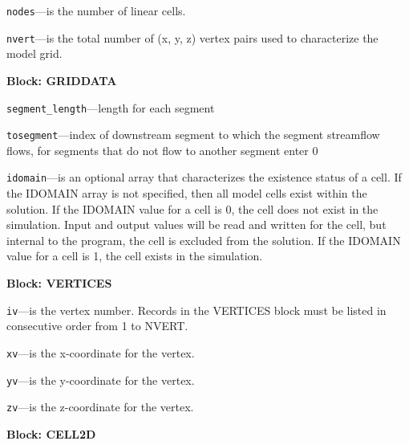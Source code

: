 \begin{description}
\item \texttt{nodes}---is the number of linear cells.

\item \texttt{nvert}---is the total number of (x, y, z) vertex pairs used to characterize the model grid.

\end{description}
\item \textbf{Block: GRIDDATA}

\begin{description}
\item \texttt{segment\_length}---length for each segment

\item \texttt{tosegment}---index of downstream segment to which the segment streamflow flows, for segments that do not flow to another segment enter 0

\item \texttt{idomain}---is an optional array that characterizes the existence status of a cell.  If the IDOMAIN array is not specified, then all model cells exist within the solution.  If the IDOMAIN value for a cell is 0, the cell does not exist in the simulation.  Input and output values will be read and written for the cell, but internal to the program, the cell is excluded from the solution.  If the IDOMAIN value for a cell is 1, the cell exists in the simulation.

\end{description}
\item \textbf{Block: VERTICES}

\begin{description}
\item \texttt{iv}---is the vertex number.  Records in the VERTICES block must be listed in consecutive order from 1 to NVERT.

\item \texttt{xv}---is the x-coordinate for the vertex.

\item \texttt{yv}---is the y-coordinate for the vertex.

\item \texttt{zv}---is the z-coordinate for the vertex.

\end{description}
\item \textbf{Block: CELL2D}

